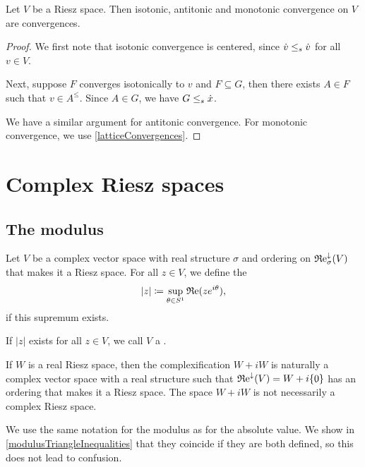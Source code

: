 \begin{lemma}
Let $V$ be a Riesz space. Then isotonic, antitonic and monotonic convergence on $V$ are convergences.
\end{lemma}
\begin{proof}
We first note that isotonic convergence is centered, since $\dot{v} \leq_s \dot{v}$ for all $v\in V$.

Next, suppose $F$ converges isotonically to $v$ and $F\subseteq G$, then there exists $A\in F$ such that $v \in A^\leq$. Since $A\in G$, we have $G\leq_s \dot{x}$.

We have a similar argument for antitonic convergence. For monotonic convergence, we use \ref{latticeConvergences}.
\end{proof}

\section{Complex Riesz spaces}
\subsection{The modulus}
\begin{definition}
Let $V$ be a complex vector space with real structure $\sigma$ and ordering on $\operatorname{\mathfrak{R}e}^\downarrow_\sigma(V)$ that makes it a Riesz space. For all $z\in V$, we define the 
\[ |z| \coloneqq \sup_{\theta\in S^1} \operatorname{\mathfrak{R}e}(ze^{i\theta}), \]
if this supremum exists.

If $|z|$ exists for all $z\in V$, we call $V$ a .
\end{definition}
If $W$ is a real Riesz space, then the complexification $W+iW$ is naturally a complex vector space with a real structure such that $\operatorname{\mathfrak{R}e}^\downarrow(V) = W+i\{0\}$ has an ordering that makes it a Riesz space. The space $W+iW$ is not necessarily a complex Riesz space.

We use the same notation for the modulus as for the absolute value. We show in \ref{modulusTriangleInequalities} that they coincide if they are both defined, so this does not lead to confusion.

